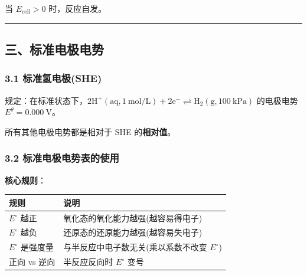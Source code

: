 当 \(E_{\text{cell}} > 0\) 时，反应自发。

\begin{center}\rule{0.5\linewidth}{0.5pt}\end{center}

\subsection{三、标准电极电势}\label{ux4e09ux6807ux51c6ux7535ux6781ux7535ux52bf}

\subsubsection{3.1 标准氢电极(SHE)}\label{ux6807ux51c6ux6c22ux7535ux6781she}

规定：在标准状态下，\(2\mathrm{H^+(aq, 1\ mol/L) + 2e^- \rightleftharpoons H_2(g, 100\ kPa)}\) 的电极电势 \(E^\theta = 0.000\ \mathrm{V}\)。

所有其他电极电势都是相对于 SHE 的\textbf{相对值}。

\subsubsection{3.2 标准电极电势表的使用}\label{ux6807ux51c6ux7535ux6781ux7535ux52bfux8868ux7684ux4f7fux7528}

\textbf{核心规则}：

{\def\LTcaptype{none} %
\begin{longtable}[]{@{}
  >{\raggedright\arraybackslash}p{}
  >{\raggedright\arraybackslash}p{}@{}}
\toprule\noalign{}
\begin{minipage}[b]{\linewidth}\raggedright
规则
\end{minipage} & \begin{minipage}[b]{\linewidth}\raggedright
说明
\end{minipage} \\
\midrule\noalign{}
\endhead
\bottomrule\noalign{}
\endlastfoot
\(E^{\circ}\) 越正 & 氧化态的氧化能力越强(越容易得电子) \\
\(E^{\circ}\) 越负 & 还原态的还原能力越强(越容易失电子) \\
\(E^{\circ}\) 是强度量 & 与半反应中电子数无关(乘以系数不改变 \(E^{\circ}\)) \\
正向 vs 逆向 & 半反应反向时 \(E^{\circ}\) 变号 \\
\end{longtable}
}

